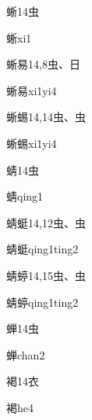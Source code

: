 \begin{Entry}{蜥}{14}{⾍}
  \begin{Phonetics}{蜥}{xi1}
  \end{Phonetics}
\end{Entry}

\begin{Entry}{蜥易}{14,8}{⾍、⽇}
  \begin{Phonetics}{蜥易}{xi1yi4}
  \end{Phonetics}
\end{Entry}

\begin{Entry}{蜥蜴}{14,14}{⾍、⾍}
  \begin{Phonetics}{蜥蜴}{xi1yi4}
  \end{Phonetics}
\end{Entry}

\begin{Entry}{蜻}{14}{⾍}
  \begin{Phonetics}{蜻}{qing1}
  \end{Phonetics}
\end{Entry}

\begin{Entry}{蜻蜓}{14,12}{⾍、⾍}
  \begin{Phonetics}{蜻蜓}{qing1ting2}
  \end{Phonetics}
\end{Entry}

\begin{Entry}{蜻蝏}{14,15}{⾍、⾍}
  \begin{Phonetics}{蜻蝏}{qing1ting2}
  \end{Phonetics}
\end{Entry}

\begin{Entry}{蝉}{14}{⾍}
  \begin{Phonetics}{蝉}{chan2}
  \end{Phonetics}
\end{Entry}

\begin{Entry}{褐}{14}{⾐}
  \begin{Phonetics}{褐}{he4}
  \end{Phonetics}
\end{Entry}


